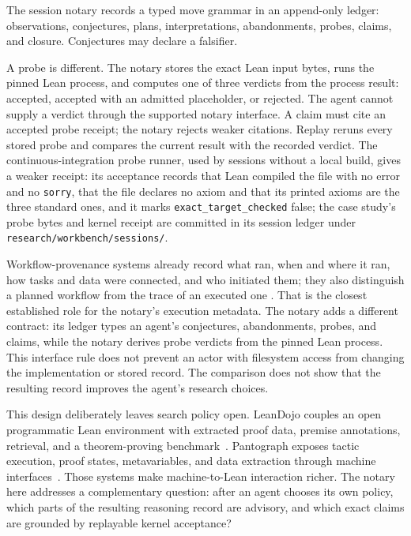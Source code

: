 \documentclass[11pt]{article}
\begin{document}
The session notary records a typed move grammar in an append-only ledger:
observations, conjectures, plans, interpretations, abandonments, probes,
claims, and closure. Conjectures may declare a falsifier.

A probe is different. The notary stores the exact Lean input bytes, runs the
pinned Lean process, and computes one of three verdicts from the process
result: accepted, accepted with an admitted placeholder, or rejected. The
agent cannot supply a verdict through the supported notary interface. A claim
must cite an accepted probe receipt; the notary rejects weaker citations.
Replay reruns every stored
probe and compares the current result with the recorded verdict. The
continuous-integration probe runner, used by sessions without a local build,
gives a weaker receipt: its acceptance records that Lean compiled the file with
no error and no \texttt{sorry}, that the file declares no axiom and that its
printed axioms are the three standard ones, and it marks
\texttt{exact\_target\_checked} false; the case study's probe bytes and kernel
receipt are committed in its session ledger under
\texttt{research/workbench/sessions/}.

Workflow-provenance systems already record what ran, when and where it ran,
how tasks and data were connected, and who initiated them; they also
distinguish a planned workflow from the trace of an executed one
\cite{workflowprovenance}. That is the closest established role for the
notary's execution metadata. The notary adds a different contract: its ledger
types an agent's conjectures, abandonments, probes, and claims, while the
notary derives probe verdicts from the pinned Lean process. This interface
rule does not prevent an actor with filesystem access from changing the
implementation or stored record. The comparison does not show that the
resulting record improves the agent's research choices.

This design deliberately leaves search policy open. LeanDojo couples an open
programmatic Lean environment with extracted proof data, premise annotations,
retrieval, and a theorem-proving benchmark~\cite{leandojo}. Pantograph exposes
tactic execution, proof states, metavariables, and data extraction through
machine interfaces~\cite{pantograph}. Those systems make machine-to-Lean
interaction richer. The notary here addresses a complementary question: after
an agent chooses its own policy, which parts of the resulting reasoning record
are advisory, and which exact claims are grounded by replayable kernel
acceptance?
\end{document}
